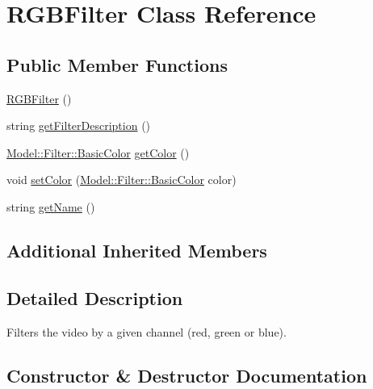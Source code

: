 \hypertarget{classModel_1_1Filter_1_1RGBFilter}{}\section{R\+G\+B\+Filter Class Reference}
\label{classModel_1_1Filter_1_1RGBFilter}
\subsection*{Public Member Functions}
\begin{DoxyCompactItemize}
\item 
\hyperlink{classModel_1_1Filter_1_1RGBFilter_a9065d7c86503c630a3422f5db4af723f}{R\+G\+B\+Filter} ()
\item 
string \hyperlink{classModel_1_1Filter_1_1RGBFilter_a62b7b60e24f92234393b840b35808e06}{get\+Filter\+Description} ()
\item 
\hyperlink{namespaceModel_1_1Filter_a54742b2fc8f6a246926cbb87b7fae1a4}{Model\+::\+Filter\+::\+Basic\+Color} \hyperlink{classModel_1_1Filter_1_1RGBFilter_a82047004348409d221728e88c0b9dfa7}{get\+Color} ()
\item 
void \hyperlink{classModel_1_1Filter_1_1RGBFilter_a353ae5c263a046f9ef3b72438cfecd95}{set\+Color} (\hyperlink{namespaceModel_1_1Filter_a54742b2fc8f6a246926cbb87b7fae1a4}{Model\+::\+Filter\+::\+Basic\+Color} color)
\item 
string \hyperlink{classModel_1_1Filter_1_1RGBFilter_a11335e13e50af74108bf926dc1340b4b}{get\+Name} ()
\end{DoxyCompactItemize}
\subsection*{Additional Inherited Members}


\subsection{Detailed Description}
Filters the video by a given channel (red, green or blue). 

\subsection{Constructor \& Destructor Documentation}
\hypertarget{classModel_1_1Filter_1_1RGBFilter_a9065d7c86503c630a3422f5db4af723f}{}
